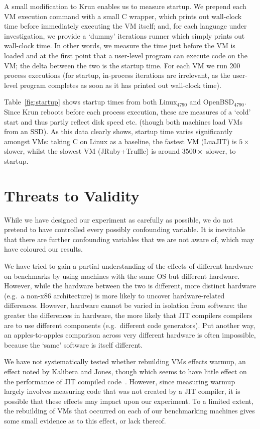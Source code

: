 \documentclass[acmsmall]{acmart}\settopmatter{printfolios=true}
\newcommand{\kalibera}{Kalibera and Jones\xspace}
\newcommand{\krun}{Krun\xspace}
\newcommand{\bencherfive}{Linux$_\mathrm{4790}$\xspace}
\newcommand{\benchersix}{OpenBSD$_\mathrm{4790}$\xspace}
\newcommand{\numstartuppexecs}{200\xspace}
\begin{document}
A small modification to \krun enables us to measure startup. We prepend each VM
execution command with a small C wrapper, which prints out wall-clock time
before immediately executing the VM itself; and, for each language under
investigation, we provide a `dummy' iterations runner which simply prints out
wall-clock time. In other words, we measure the time just before the VM is loaded
and at the first point that a user-level program can execute code on the VM; the
delta between the two is the startup time. For each VM we run \numstartuppexecs process
executions (for startup, in-process iterations are irrelevant,
as the user-level program completes as soon as it has printed out wall-clock
time).

Table~\ref{fig:startup} shows startup times from both \bencherfive and \benchersix. Since
\krun reboots before each process execution, these are measures of a `cold'
start and thus partly reflect disk speed etc. (though both machines load VMs
from an SSD). As this data clearly shows, startup time varies significantly amongst VMs:
taking C on Linux as a baseline, the fastest VM (LuaJIT) is $5\times$ slower, whilst the
slowest VM (JRuby+Truffle) is around $3500\times$ slower, to startup.


\section{Threats to Validity}
\label{sec:threats}

While we have designed our experiment as carefully as possible, we do not
pretend to have controlled every possibly confounding variable. It
is inevitable that there are further confounding variables that
we are not aware of, which may have coloured our results.

We have tried to gain a partial understanding of the effects of different
hardware on benchmarks by using machines with the same OS but
different hardware. However, while the hardware between the two is
different, more distinct hardware (e.g.~a non-x86 architecture)
is more likely to uncover hardware-related differences.
However, hardware cannot be varied in isolation from software:
the greater the differences in hardware, the more likely that JIT compilers
compilers are to use different components (e.g.~different code generators).
Put another way, an apples-to-apples comparison across very different
hardware is often impossible, because the `same' software is itself different.

We have not systematically tested whether rebuilding VMs effects warmup, an
effect noted by \kalibera, though which seems to have little effect on
the performance of JIT compiled code~\cite{barrett15approaches}. However, since measuring warmup largely
involves measuring code that was not created by a JIT compiler, it is possible
that these effects may impact upon our experiment. To a limited extent, the
rebuilding of VMs that occurred on each of our benchmarking machines gives
some small evidence as to this effect, or lack thereof.
\end{document}
